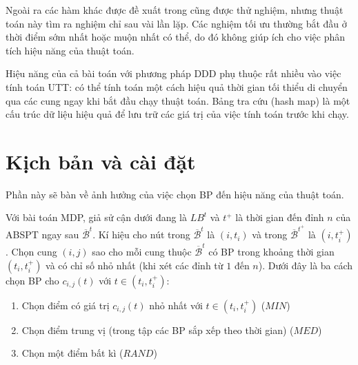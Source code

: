 \documentclass[../main.tex]{subfiles}
\begin{document}

Ngoài ra các hàm khác được đề xuất trong \cite{figliozzi2012time} cũng
được thử nghiệm, nhưng thuật toán này tìm ra nghiệm chỉ sau vài lần lặp.
Các nghiệm tối ưu thường bắt đầu ở thời điểm sớm nhất hoặc muộn nhất có
thể, do đó không giúp ích cho việc phân tích hiệu năng của thuật toán.

Hiệu năng của cả bài toán với phương pháp DDD phụ thuộc rất nhiều
vào việc tính toán UTT: có thể tính toán một cách hiệu quả thời gian tối
thiểu di chuyển qua các cung ngay khi bắt đầu chạy thuật toán. Bảng tra
cứu (hash map) là một cấu trúc dữ liệu hiệu quả để lưu trữ các giá trị của việc tính toán trước khi chạy.

\section{Kịch bản và cài
đặt}\label{kux1ecbch-bux1ea3n-vuxe0-cuxe0i-ux111ux1eb7t}

Phần này sẽ bàn về ảnh hưởng của việc chọn BP đến hiệu năng của
thuật toán.

Với bài toán MDP, giả sử cận dưới đang là \(LB^t\) và \(t^+\) là thời
gian đến đỉnh \(n\) của ABSPT ngay sau \(\overline{\mathcal{B}}^t\). Kí
hiệu cho nút trong \(\overline{\mathcal{B}}^t\) là \((i,t_i)\) và trong
\(\overline{\mathcal{B}}^{t^+}\) là \((i, t_i^+)\). Chọn cung \((i,j)\)
sao cho mỗi cung thuộc \(\overline{\mathcal{B}}^{t}\) có BP trong
khoảng thời gian \((t_i, t_i^+)\) và có chỉ số nhỏ nhất (khi xét các
đỉnh từ \(1\) đến \(n\)). Dưới đây là ba cách chọn BP cho
\(c_{i,j}(t)\) với \(t\in (t_i, t_i^+)\):

\begin{enumerate}
\def\labelenumi{\arabic{enumi}.}
\tightlist
\item
  Chọn điểm có giá trị \(c_{i, j}(t)\) nhỏ nhất với
  \(t\in (t_i, t_i^+)\) (\(MIN\))
\item
  Chọn điểm trung vị (trong tập các BP sắp xếp theo thời gian)
  (\(MED\))
\item
  Chọn một điểm bất kì (\(RAND\))
\end{enumerate}


\end{document}
